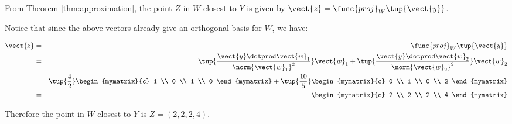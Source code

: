 \begin{solution}
From Theorem \ref{thm:approximation}, the point $Z$ in $W$ closest to
$Y$ is given by $\vect{z} = \func{proj}_{W}\tup{\vect{y}}$.

Notice that since the above vectors already give an orthogonal basis for $W$, we have:

\begin{eqnarray*}
\vect{z} &=& \func{proj}_{W}\tup{\vect{y}}\\
&=&
\tup{\frac{\vect{y} \dotprod \vect{w}_1}{ \norm{\vect{w}_1}^2}} \vect{w}_1
+
\tup{\frac{\vect{y} \dotprod \vect{w}_2}{ \norm{\vect{w}_2}^2}} \vect{w}_2 \\
&=& 
\tup{\frac{4}{2} } \begin{mymatrix}{c}
1 \\
0 \\
1 \\
0 
\end{mymatrix}
+
\tup{\frac{10}{5} }
\begin{mymatrix}{c}
0 \\
1 \\
0 \\
2
\end{mymatrix} \\
&=& 
\begin{mymatrix}{c}
2 \\
2 \\
2 \\
4 
\end{mymatrix}
\end{eqnarray*} 

Therefore the point in $W$ closest to $Y$ is $Z = (2,2,2,4)$. \\


\end{solution}
